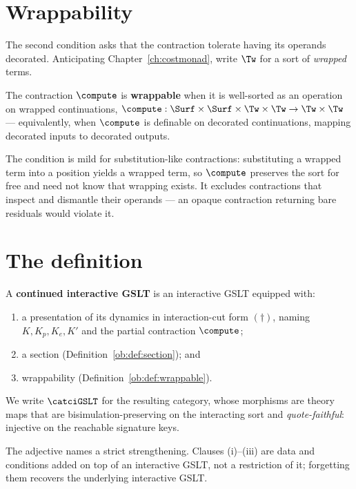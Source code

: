 \section{Wrappability}

The second condition asks that the contraction tolerate having its operands decorated.
Anticipating Chapter~\ref{ch:costmonad}, write $\Tw$ for a sort of \emph{wrapped} terms.

\begin{definition}[Wrappability]
\label{ob:def:wrappable}
The contraction $\compute$ is \textbf{wrappable} when it is well-sorted as an operation
on wrapped continuations,
$\compute : \Surf \times \Surf \times \Tw \times \Tw \to \Tw \times \Tw$ ---
equivalently, when $\compute$ is definable on decorated continuations, mapping decorated
inputs to decorated outputs.
\end{definition}

The condition is mild for substitution-like contractions: substituting a wrapped term
into a position yields a wrapped term, so $\compute$ preserves the sort for free and
need not know that wrapping exists. It excludes contractions that inspect and dismantle
their operands --- an opaque contraction returning bare residuals would violate it.

\section{The definition}

\begin{definition}
\label{ob:def:cigslt}
A \textbf{continued interactive GSLT} is an interactive GSLT equipped with:
\begin{enumerate}[label=(\roman*),leftmargin=2.5em]
  \item a presentation of its dynamics in interaction-cut form $(\dagger)$, naming
    $K, K_p, K_e, K'$ and the partial contraction $\compute$;
  \item a section (Definition~\ref{ob:def:section}); and
  \item wrappability (Definition~\ref{ob:def:wrappable}).
\end{enumerate}
We write $\catciGSLT$ for the resulting category, whose morphisms are theory maps that are
bisimulation-preserving on the interacting sort and \emph{quote-faithful}: injective on
the reachable signature keys.
\end{definition}

The adjective names a strict strengthening. Clauses (i)--(iii) are data and conditions
added on top of an interactive GSLT, not a restriction of it; forgetting them recovers
the underlying interactive GSLT.

